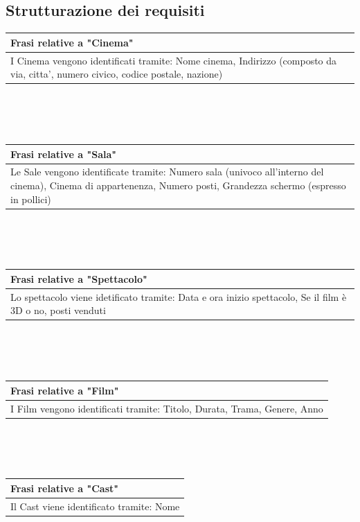 \documentclass[10pt]{article}
\begin{document}
 	\subsection{Strutturazione dei requisiti}
	\begin{tabular} { |p{16.8cm}| }
 		\hline
 		\rowcolor{lightgray}
 		\textbf{Frasi relative a "Cinema"} \\
 		\hline
 		I Cinema vengono identificati tramite: Nome cinema, Indirizzo (composto da via, citta', numero civico, codice postale, nazione) \\
 		\hline 		
 	\end{tabular}
 	\\\\\\
	\begin{tabular} { |p{16.8cm}| }
	 	\hline
	 	\rowcolor{lightgray}
	 	\textbf{Frasi relative a "Sala"} \\
	 	\hline
	 	Le Sale vengono identificate tramite: Numero sala (univoco all'interno del cinema), Cinema di appartenenza, Numero posti, Grandezza schermo (espresso in pollici) \\
	 	\hline 		
	\end{tabular} 
	\\\\\\
	\begin{tabular} { |p{16.8cm}| }
		\hline
		\rowcolor{lightgray}
		\textbf{Frasi relative a "Spettacolo"} \\
		\hline
		Lo spettacolo viene idetificato tramite: Data e ora inizio spettacolo, Se il film è 3D o no, posti venduti \\
		\hline 		
	\end{tabular} 
	\\\\\\
	\begin{tabular} { |p{16.8cm}| }
		\hline
		\rowcolor{lightgray}
		\textbf{Frasi relative a "Film"} \\
		\hline
		I Film vengono identificati tramite: Titolo, Durata, Trama, Genere, Anno \\
		\hline 		
	\end{tabular} 
 	\\\\\\
 	\begin{tabular} { |p{16.8cm}| }
 		\hline
 		\rowcolor{lightgray}
 		\textbf{Frasi relative a "Cast"} \\
 		\hline
 		Il Cast viene identificato tramite: Nome \\
 		\hline 		
 	\end{tabular} 
\end{document}
